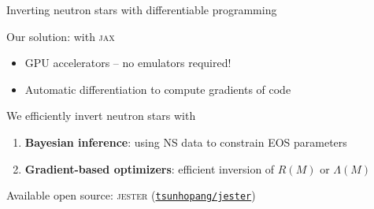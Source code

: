 \documentclass[usenames,dvipsnames,t]{beamer}
\begin{document}
\begin{frame}{Inverting neutron stars with differentiable programming}
  \def\x{3mm}
  \def\y{7mm}
  \def\z{10mm}

  Our solution:  with \textsc{jax}~\cite{frostig2018compiling}
  \begin{itemize}
    \vspace{\x}
    
    \item GPU accelerators -- no emulators required!
    
    \vspace{\x}
    \item Automatic differentiation to compute gradients of code
  \end{itemize}

  \vspace{\y}

  We efficiently invert neutron stars with
  \begin{enumerate}
    \vspace{\x}

    \item \textbf{Bayesian inference}: using NS data to constrain EOS parameters

    \vspace{\x}

    \item \textbf{Gradient-based optimizers}: efficient inversion of $R(M)$ or $\Lambda(M)$
  \end{enumerate}

  \vspace{\z}
  
  Available open source: \textsc{jester} (\href{https://github.com/tsunhopang/jester}{{\faGithub \texttt{tsunhopang/jester}}})
\end{frame}
\end{document}
